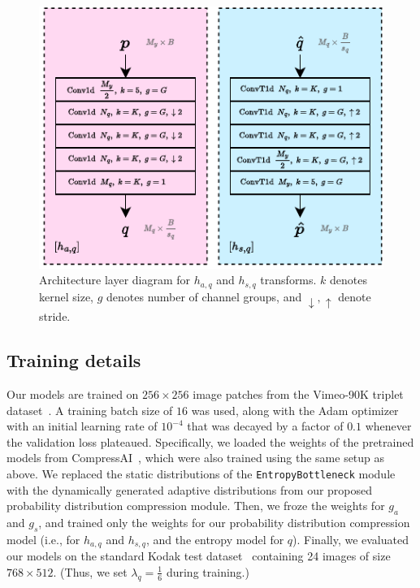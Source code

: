 \begin{figure}[htbp]
  \centering
  \includegraphics[width=1.0\linewidth]{img/pdf_compression/arch-hasq.pdf}
  \caption[Architecture layer diagram for $h_{a,q}$ and $h_{s,q}$ transforms]{%
    Architecture layer diagram for $h_{a,q}$ and $h_{s,q}$ transforms.
    $k$ denotes kernel size, $g$ denotes number of channel groups, and $\downarrow, \uparrow$ denote stride.%
  }
  \label{fig:pdf/arch-hasq}
\end{figure}




\subsection{Training details}
\label{sec:pdf_compression/experimental_setup/training_details}

Our models are trained on $256 \times 256$ image patches from the Vimeo-90K triplet dataset~\cite{xue2019video}.
A training batch size of $16$ was used, along with the Adam optimizer~\cite{kingma2014adam} with an initial learning rate of $10^{-4}$ that was decayed by a factor of $0.1$ whenever the validation loss plateaued.
Specifically, we loaded the weights of the pretrained models from CompressAI~\cite{begaint2020compressai}, which were also trained using the same setup as above.
We replaced the static distributions of the \texttt{EntropyBottleneck} module with the dynamically generated adaptive distributions from our proposed probability distribution compression module.
Then, we froze the weights for $g_a$ and $g_s$, and trained only the weights for our probability distribution compression model (i.e., for $h_{a,q}$ and $h_{s,q}$, and the entropy model for $q$).
Finally, we evaluated our models on the standard Kodak test dataset~\cite{kodak_dataset} containing 24 images of size $768 \times 512$.
(Thus, we set $\lambda_q = \frac{1}{6}$ during training.)




